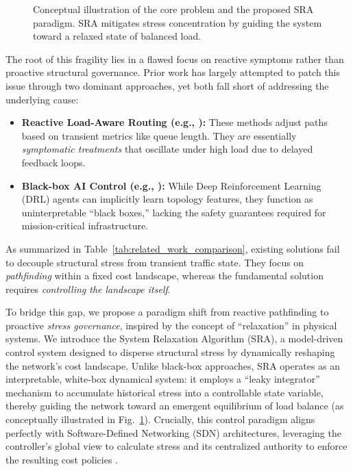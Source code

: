 \documentclass{ccjnl}
\begin{document}
\begin{figure}[t!]
    \caption{Conceptual illustration of the core problem and the proposed SRA paradigm. SRA mitigates stress concentration by guiding the system toward a relaxed state of balanced load.}
    \label{fig:intro_scenario}
\end{figure}

The root of this fragility lies in a flawed focus on reactive symptoms rather than proactive structural governance. 
Prior work has largely attempted to patch this issue through two dominant approaches, yet both fall short of addressing the underlying cause:
\begin{itemize}
    \item \textbf{Reactive Load-Aware Routing (e.g., \cite{Macabale2020Cradle}):} These methods adjust paths based on transient metrics like queue length. They are essentially \textit{symptomatic treatments} that oscillate under high load due to delayed feedback loops.
    \item \textbf{Black-box AI Control (e.g., \cite{Wei2023GRLPS}):} While Deep Reinforcement Learning (DRL) agents can implicitly learn topology features, they function as uninterpretable ``black boxes,'' lacking the safety guarantees required for mission-critical infrastructure.
\end{itemize}

As summarized in Table~\ref{tab:related_work_comparison}, existing solutions fail to decouple structural stress from transient traffic state. They focus on \textit{pathfinding} within a fixed cost landscape, whereas the fundamental solution requires \textit{controlling the landscape itself}.

To bridge this gap, we propose a paradigm shift from reactive pathfinding to proactive \textit{stress governance}, inspired by the concept of ``relaxation'' in physical systems.
We introduce the System Relaxation Algorithm (SRA), a model-driven control system designed to disperse structural stress by dynamically reshaping the network's cost landscape.
Unlike black-box approaches, SRA operates as an interpretable, white-box dynamical system: it employs a ``leaky integrator'' mechanism to accumulate historical stress into a controllable state variable, thereby guiding the network toward an emergent equilibrium of load balance (as conceptually illustrated in Fig.~\ref{fig:intro_scenario}).
Crucially, this control paradigm aligns perfectly with Software-Defined Networking (SDN) architectures, leveraging the controller's global view to calculate stress and its centralized authority to enforce the resulting cost policies \cite{hou2020reliable}.
\end{document}
